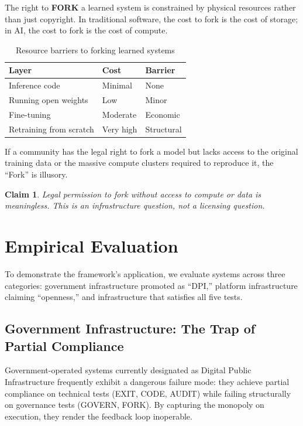 \documentclass{article}
\newtheorem{claim}{Claim}
\begin{document}
The right to \textbf{FORK} a learned system is constrained by physical resources rather than just copyright. In traditional software, the cost to fork is the cost of storage; in AI, the cost to fork is the cost of compute.

\begin{table}[htbp]
\centering
\begin{tabular}{@{}lll@{}}
\toprule
\textbf{Layer} & \textbf{Cost} & \textbf{Barrier} \\
\midrule
Inference code & Minimal & None \\
Running open weights & Low & Minor \\
Fine-tuning & Moderate & Economic \\
Retraining from scratch & Very high & Structural \\
\bottomrule
\end{tabular}
\caption{Resource barriers to forking learned systems}
\end{table}

If a community has the legal right to fork a model but lacks access to the original training data or the massive compute clusters required to reproduce it, the ``Fork'' is illusory.

\begin{claim}
Legal permission to fork without access to compute or data is meaningless. This is an infrastructure question, not a licensing question.
\end{claim}

\section{Empirical Evaluation}
\label{sec:diagnosis}

To demonstrate the framework's application, we evaluate systems across three categories: government infrastructure promoted as ``DPI,'' platform infrastructure claiming ``openness,'' and infrastructure that satisfies all five tests.

\subsection{Government Infrastructure: The Trap of Partial Compliance}

Government-operated systems currently designated as Digital Public Infrastructure frequently exhibit a dangerous failure mode: they achieve partial compliance on technical tests (EXIT, CODE, AUDIT) while failing structurally on governance tests (GOVERN, FORK). By capturing the monopoly on execution, they render the feedback loop inoperable.
\end{document}
